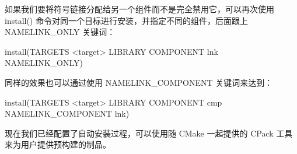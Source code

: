 如果我们要将符号链接分配给另一个组件而不是完全禁用它，可以再次使用 install() 命令对同一个目标进行安装，并指定不同的组件，后面跟上 NAMELINK\_ONLY 关键词：

\begin{shell}
install(TARGETS <target> LIBRARY
        COMPONENT lnk NAMELINK_ONLY)
\end{shell}

同样的效果也可以通过使用 NAMELINK\_COMPONENT 关键词来达到：

\begin{shell}
install(TARGETS <target> LIBRARY
        COMPONENT cmp NAMELINK_COMPONENT lnk)
\end{shell}

现在我们已经配置了自动安装过程，可以使用随 CMake 一起提供的 CPack 工具来为用户提供预构建的制品。








































